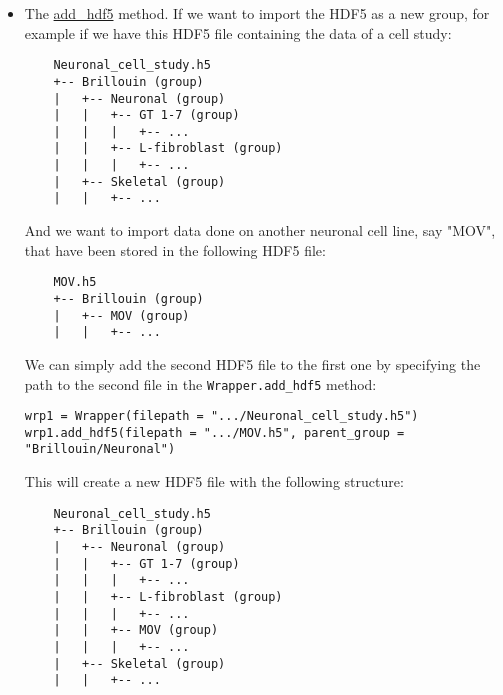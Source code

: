 \begin{itemize}
    \item The \hyperref[subsec:wrapper.add_hdf5]{add\_hdf5} method. If we want to import the HDF5 as a new group, for example if we have this HDF5 file containing the data of a cell study:
    \begin{verbatim}
    Neuronal_cell_study.h5
    +-- Brillouin (group)
    |   +-- Neuronal (group)
    |   |   +-- GT 1-7 (group)
    |   |   |   +-- ...
    |   |   +-- L-fibroblast (group)
    |   |   |   +-- ...
    |   +-- Skeletal (group)
    |   |   +-- ...
    \end{verbatim}
    And we want to import data done on another neuronal cell line, say "MOV", that have been stored in the following HDF5 file:
    \begin{verbatim}
    MOV.h5
    +-- Brillouin (group)
    |   +-- MOV (group)
    |   |   +-- ...
    \end{verbatim}
    We can simply add the second HDF5 file to the first one by specifying the path to the second file in the \texttt{Wrapper.add\_hdf5} method:
\begin{lstlisting}
wrp1 = Wrapper(filepath = ".../Neuronal_cell_study.h5")
wrp1.add_hdf5(filepath = ".../MOV.h5", parent_group = "Brillouin/Neuronal")
\end{lstlisting}
    This will create a new HDF5 file with the following structure:
    \begin{verbatim}
    Neuronal_cell_study.h5
    +-- Brillouin (group)
    |   +-- Neuronal (group)
    |   |   +-- GT 1-7 (group)
    |   |   |   +-- ...
    |   |   +-- L-fibroblast (group)
    |   |   |   +-- ...
    |   |   +-- MOV (group)
    |   |   |   +-- ...
    |   +-- Skeletal (group)
    |   |   +-- ...
    \end{verbatim}
\end{itemize} 
